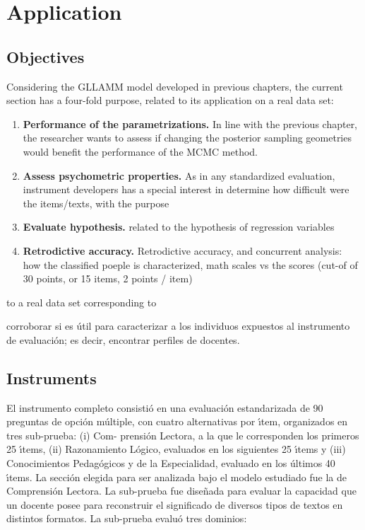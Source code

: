 \chapter{Application} \label{chap:application}

\section{Objectives}

Considering the GLLAMM model developed in previous chapters, the current section has a four-fold purpose, related to its application on a real data set:

\begin{enumerate}
	\item \textbf{Performance of the parametrizations.} In line with the previous chapter, the researcher wants to assess if changing the posterior sampling geometries would benefit the performance of the MCMC method.
	\item \textbf{Assess psychometric properties.} As in any standardized evaluation, instrument developers has a special interest in determine how difficult were the items/texts, with the purpose 
	\item \textbf{Evaluate hypothesis.} related to the hypothesis of regression variables
	\item \textbf{Retrodictive accuracy.} Retrodictive accuracy, and concurrent analysis: how the classified poeple is characterized, math scales vs the scores (cut-of of 30 points, or 15 items, 2 points / item)
\end{enumerate}

to a real data set corresponding to 

corroborar si es útil para caracterizar a los
individuos expuestos al instrumento de evaluación; es decir, encontrar perfiles de docentes.



\section{Instruments}

El instrumento completo consistió en una evaluación estandarizada de 90 preguntas de
opción múltiple, con cuatro alternativas por ı́tem, organizados en tres sub-prueba: (i) Com-
prensión Lectora, a la que le corresponden los primeros 25 ı́tems, (ii) Razonamiento
Lógico, evaluados en los siguientes 25 ı́tems y (iii) Conocimientos Pedagógicos y de la
Especialidad, evaluado en los últimos 40 ı́tems.
La sección elegida para ser analizada bajo el modelo estudiado fue la de Comprensión
Lectora. La sub-prueba fue diseñada para evaluar la capacidad que un docente posee para
reconstruir el significado de diversos tipos de textos en distintos formatos. La sub-prueba
evaluó tres dominios:

